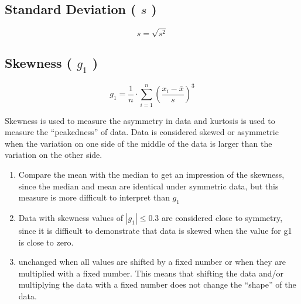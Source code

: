 \subsection{Standard Deviation ( $s$ ) \cite{ism-1}}\label{Standard Deviation}
\[
    s = \sqrt{s^2}
\]

\subsection{Skewness ( $g_1$ ) \cite{ism-1}}\label{Skewness}
\[
    g_1 = \displaystyle\dfrac{1}{n} \cdot \sum_{i=1}^{n} \left( \dfrac{x_i - \bar{x}}{s} \right)^3
\]

Skewness is used to measure the asymmetry in data and kurtosis is used to measure the “peakedness” of data. Data is considered skewed or asymmetric when the variation on one side of the middle of the data is larger than the variation on the other side.

\begin{enumerate}
    \item Compare the mean with the median to get an impression of the skewness, since the median and mean are identical under symmetric data, but this measure is more difficult to interpret than $g_1$
    \item Data with skewness values of $|g_1| \leq 0.3$ are considered close to symmetry, since it is difficult to demonstrate that data is skewed when the value for g1 is close to zero.
    \item unchanged when all values are shifted by a fixed number or when they are multiplied with a fixed number. This means that shifting the data and/or multiplying the data with a fixed number does not change the “shape” of the data.
\end{enumerate}

